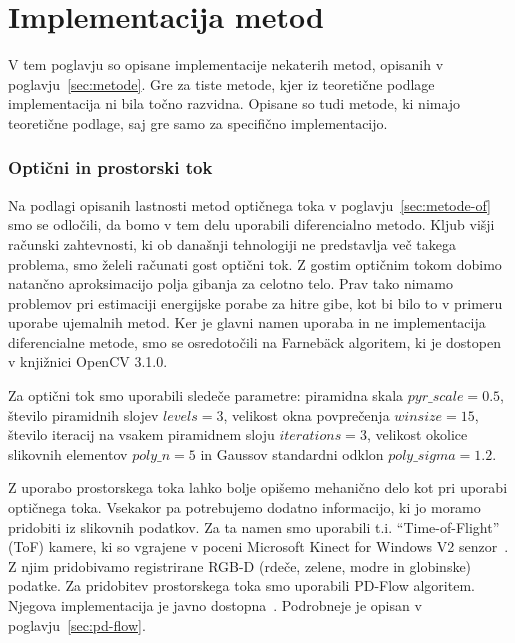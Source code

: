 \chapter{Implementacija metod}
V tem poglavju so opisane implementacije nekaterih metod, opisanih v poglavju~\ref{sec:metode}. Gre za tiste metode, kjer iz teoretične podlage implementacija ni bila točno razvidna. Opisane so tudi metode, ki nimajo teoretične podlage, saj gre samo za specifično implementacijo.

\subsection{Optični in prostorski tok}
Na podlagi opisanih lastnosti metod optičnega toka v poglavju~\ref{sec:metode-of} smo se odločili, da bomo v tem delu uporabili diferencialno metodo. Kljub višji računski zahtevnosti, ki ob današnji tehnologiji ne predstavlja več takega problema, smo želeli računati gost optični tok. Z gostim optičnim tokom dobimo natančno aproksimacijo polja gibanja za celotno telo. Prav tako nimamo problemov pri estimaciji energijske porabe za hitre gibe, kot bi bilo to v primeru uporabe ujemalnih metod. Ker je glavni namen uporaba in ne implementacija diferencialne metode, smo se osredotočili na Farneb{\"a}ck algoritem, ki je dostopen v knjižnici OpenCV 3.1.0.

Za optični tok smo uporabili sledeče parametre: piramidna skala $pyr\_scale=\num{0.5}$, število piramidnih slojev $levels=3$, velikost okna povprečenja $winsize=15$, število iteracij na vsakem piramidnem sloju $iterations=3$, velikost okolice slikovnih elementov $poly\_n=5$ in Gaussov standardni odklon $poly\_sigma=\num{1.2}$.

Z uporabo prostorskega toka lahko bolje opišemo mehanično delo kot pri uporabi optičnega toka. Vsekakor pa potrebujemo dodatno informacijo, ki jo moramo pridobiti iz slikovnih podatkov. Za ta namen smo uporabili t.i. ``Time-of-Flight'' (ToF) kamere, ki so vgrajene v poceni Microsoft Kinect for Windows V2 senzor~\cite{Yang2015KinectV2}. Z njim pridobivamo registrirane RGB-D (rdeče, zelene, modre in globinske) podatke. Za pridobitev prostorskega toka smo uporabili PD-Flow algoritem. Njegova implementacija je javno dostopna~\cite{jaimez2015primal}. Podrobneje je opisan v poglavju~\ref{sec:pd-flow}.



